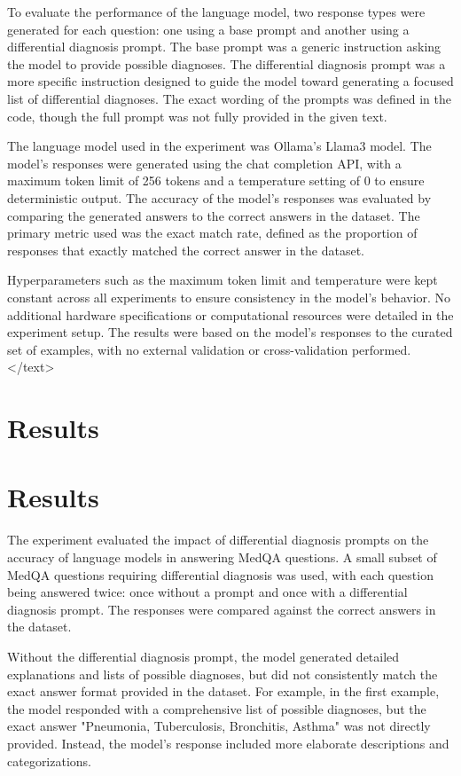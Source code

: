 \documentclass{article}
\begin{document}
To evaluate the performance of the language model, two response types were generated for each question: one using a base prompt and another using a differential diagnosis prompt. The base prompt was a generic instruction asking the model to provide possible diagnoses. The differential diagnosis prompt was a more specific instruction designed to guide the model toward generating a focused list of differential diagnoses. The exact wording of the prompts was defined in the code, though the full prompt was not fully provided in the given text.

The language model used in the experiment was Ollama's Llama3 model. The model's responses were generated using the chat completion API, with a maximum token limit of 256 tokens and a temperature setting of 0 to ensure deterministic output. The accuracy of the model's responses was evaluated by comparing the generated answers to the correct answers in the dataset. The primary metric used was the exact match rate, defined as the proportion of responses that exactly matched the correct answer in the dataset.

Hyperparameters such as the maximum token limit and temperature were kept constant across all experiments to ensure consistency in the model's behavior. No additional hardware specifications or computational resources were detailed in the experiment setup. The results were based on the model's responses to the curated set of examples, with no external validation or cross-validation performed.
</text>
\section{Results}
\section{Results}

The experiment evaluated the impact of differential diagnosis prompts on the accuracy of language models in answering MedQA questions. A small subset of MedQA questions requiring differential diagnosis was used, with each question being answered twice: once without a prompt and once with a differential diagnosis prompt. The responses were compared against the correct answers in the dataset.

Without the differential diagnosis prompt, the model generated detailed explanations and lists of possible diagnoses, but did not consistently match the exact answer format provided in the dataset. For example, in the first example, the model responded with a comprehensive list of possible diagnoses, but the exact answer "Pneumonia, Tuberculosis, Bronchitis, Asthma" was not directly provided. Instead, the model's response included more elaborate descriptions and categorizations.
\end{document}
